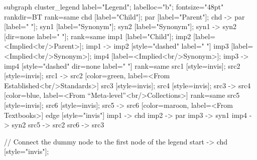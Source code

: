 \documentclass{article}
\begin{document}
{subgraph cluster_legend {
    label="Legend";
    labelloc="b";
    fontsize="48pt"
    rankdir=BT
    {
        rank=same
        chd [label="Child"];
        par [label="Parent"];
        chd -> par [label="                "];
        syn1 [label="Synonym"];
        syn2 [label="Synonym"];
        syn1 -> syn2 [dir=none label="                "];
    }
    {
        rank=same
        imp1 [label="Child"];
        imp2 [label=<Implied<br/>Parent>];
        imp1 -> imp2 [style="dashed" label="                "]
        imp3 [label=<Implied<br/>Synonym>];
        imp4 [label=<Implied<br/>Synonym>];
        imp3 -> imp4 [style="dashed" dir=none label="                "]
    }
{
rank=same
src1 [style=invis];
src2 [style=invis];
src1 -> src2 [color=green, label=<From Established<br/>Standards>]
src3 [style=invis];
src4 [style=invis];
src3 -> src4 [color=blue, label=<From ``Meta-level''<br/>Collections>]
}
{
rank=same
src5 [style=invis];
src6 [style=invis];
src5 -> src6 [color=maroon, label=<From Textbooks>]
}
    edge [style="invis"]
    imp1 -> chd
    imp2 -> par
    imp3 -> syn1
    imp4 -> syn2
src5 -> src2
src6 -> src3
}

// Connect the dummy node to the first node of the legend
start -> chd [style="invis"];
}
\end{document}
